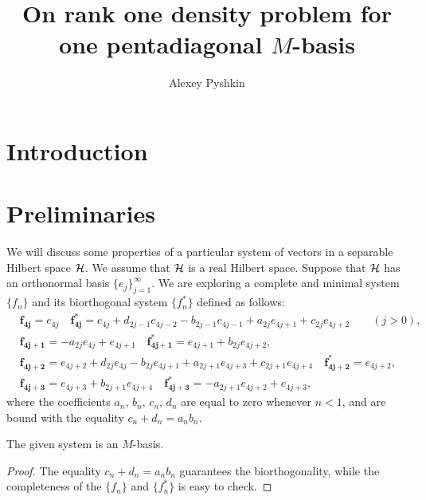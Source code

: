 \documentclass[12pt]{amsart}
\theoremstyle{case}
\begin{document}
\title{On rank one density problem for one pentadiagonal $M$-basis}
\author{Alexey Pyshkin}
\maketitle

\section{Introduction}
\section{Preliminaries}
  We will discuss some properties of a particular system of vectors in a separable Hilbert space $\cal{H}$.
  We assume that $\cal{H}$ is a real Hilbert space. 
  Suppose that $\cal{H}$ has an orthonormal basis $\{e_j\}_{j=1}^\infty$.
  We are exploring a complete and minimal system $\{f_n\}$ and its biorthogonal system $\{f^*_n\}$ defined as follows:
  \begin{equation}
    \label{main-system}
    \begin{aligned}
      &\mathbf{f_{4j}} = e_{4j} \quad 
      \mathbf{f^*_{4j}} = e_{4j} + d_{2j - 1} e_{4j-2} - b_{2j-1} e_{4j-1} + a_{2j} e_{4j+1} + c_{2j} e_{4j+2} \qquad
      (j > 0),\\
      &\mathbf{f_{4j+1}} = -a_{2j} e_{4j} + e_{4j+1} \quad 
      \mathbf{f^*_{4j+1}} = e_{4j+1} + b_{2j} e_{4j+2},\\
      &\mathbf{f_{4j+2}} = e_{4j+2} + d_{2j} e_{4j} - b_{2j} e_{4j+1} + a_{2j+1} e_{4j+3} + c_{2j+1} e_{4j+4}\quad
      \mathbf{f^*_{4j+2}} = e_{4j+2},\\
      &\mathbf{f_{4j+3}} = e_{4j+3} + b_{2j+1} e_{4j+4}\quad
      \mathbf{f^*_{4j+3}} = -a_{2j+1} e_{4j+2} + e_{4j+3},
    \end{aligned}
  \end{equation}
    where the coefficients $a_n$, $b_n$, $c_n$, $d_n$ are equal to zero whenever $n < 1$, and are bound with the equality
      $c_n + d_n = a_n b_n$. 
  \begin{prop}
    The given system is an $M$-basis.
  \end{prop}
  \begin{proof}
    The equality $c_n + d_n = a_n b_n$ guarantees the bi\-orthogonality,
      while the completeness of the $\{f_n\}$ and $\{f_n^*\}$ is easy to check.
  \end{proof}
  
\end{document}
